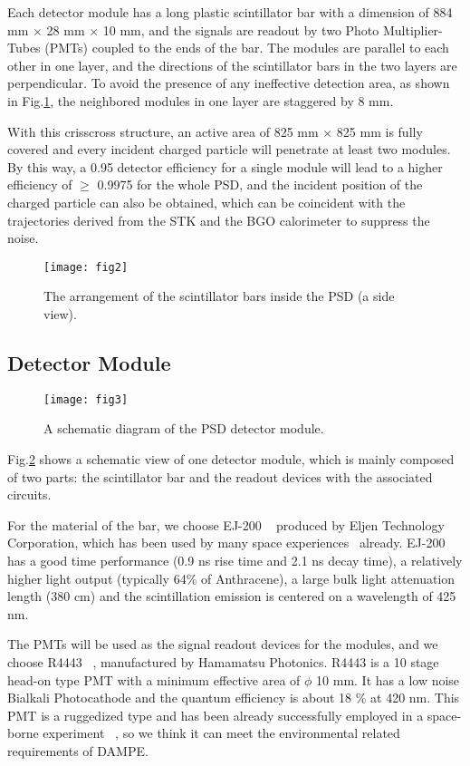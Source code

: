 \documentclass[preprint]{elsarticle}
\begin{document}
Each detector module has a long plastic scintillator bar with a dimension of 884 mm $\times$ 28 mm $\times$ 10 mm, and the signals are readout by two Photo Multiplier-Tubes (PMTs) coupled to the ends of the bar. The modules are parallel to each other in one layer, and the directions of the scintillator bars in the two layers are perpendicular. To avoid the presence of any ineffective detection area, as shown in Fig.\ref{fig:fig2}, the neighbored modules in one layer are staggered by 8 mm.

With this crisscross structure, an active area of 825 mm $\times$ 825 mm is fully covered and every incident charged particle will penetrate at least two modules. By this way, a 0.95 detector efficiency for a single module will lead to a higher efficiency of $\geq$ 0.9975 for the whole PSD, and the incident position of the charged particle can also be obtained, which can be coincident with the trajectories derived from the STK and the BGO calorimeter to suppress the noise.

\begin{figure}
 \centering
 \texttt{[image: fig2]}
\caption{The arrangement of the scintillator bars inside the PSD (a side view).}
\label{fig:fig2}
\end{figure}

\subsection{Detector Module}
\label{sec:modules}

\begin{figure}
 \centering
 \texttt{[image: fig3]}
\caption{A schematic diagram of the PSD detector module.}
\label{fig:fig3}
\end{figure}

Fig.\ref{fig:fig3} shows a schematic view of one detector module, which is mainly composed of two parts: the scintillator bar and the readout devices with the associated circuits.

For the material of the bar, we choose EJ-200 ~\cite{scintillator} produced by Eljen Technology Corporation, which has been used by many space experiences~\cite{ACD_GLAST,AMS_TOF} already. EJ-200 has a good time performance (0.9 ns rise time and 2.1 ns decay time), a relatively higher light output (typically 64\% of Anthracene), a large bulk light attenuation length (380 cm) and the scintillation emission is centered on a wavelength of 425 nm.

The PMTs will be used as the signal readout devices for the modules, and we choose R4443 ~\cite{r4443}, manufactured by Hamamatsu Photonics. R4443 is a 10 stage head-on type PMT with a minimum effective area of $\phi$ 10 mm. It has a low noise Bialkali Photocathode and the quantum efficiency is about 18 \% at 420 nm. This PMT is a ruggedized type and has been already successfully employed in a space-borne experiment ~\cite{ACD_GLAST}, so we think it can meet the environmental related requirements of DAMPE.
\end{document}
